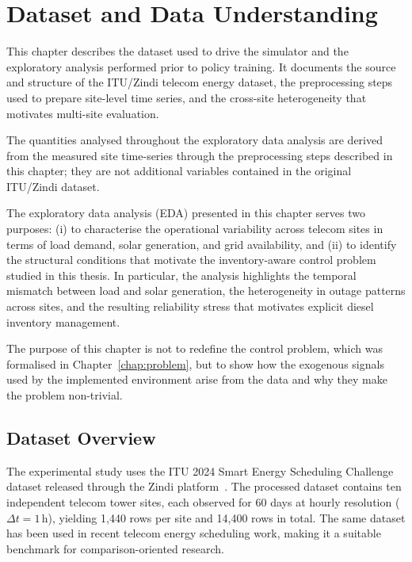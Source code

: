 \chapter{Dataset and Data Understanding}
\label{chap:datasets-setup}
\setlength{\emergencystretch}{1.5em}

This chapter describes the dataset used to drive the simulator and the
exploratory analysis performed prior to policy training.  It documents the
source and structure of the ITU/Zindi telecom energy dataset, the
preprocessing steps used to prepare site-level time series, and the
cross-site heterogeneity that motivates multi-site evaluation.

The quantities analysed throughout the exploratory data analysis are
derived from the measured site time-series through the preprocessing
steps described in this chapter; they are not additional variables
contained in the original ITU/Zindi dataset.

The exploratory data analysis (EDA) presented in this chapter serves two
purposes: (i) to characterise the operational variability across telecom
sites in terms of load demand, solar generation, and grid availability, and
(ii) to identify the structural conditions that motivate the
inventory-aware control problem studied in this thesis.  In particular,
the analysis highlights the temporal mismatch between load and solar
generation, the heterogeneity in outage patterns across sites, and the
resulting reliability stress that motivates explicit diesel inventory
management.

The purpose of this chapter is not to redefine the control problem, which
was formalised in Chapter~\ref{chap:problem}, but to show how the exogenous
signals used by the implemented environment arise from the data and why
they make the problem non-trivial.


\section{Dataset Overview}
\label{sec:dataset_overview}

The experimental study uses the ITU 2024 Smart Energy Scheduling Challenge
dataset released through the Zindi platform~\citep{itu2024zindi}.  The
processed dataset contains ten independent telecom tower sites, each observed
for 60 days at hourly resolution ($\Delta t = 1$\,h), yielding 1{,}440 rows
per site and 14{,}400 rows in total.  The same dataset has been used in
recent telecom energy scheduling work, making it a suitable benchmark for
comparison-oriented research.

